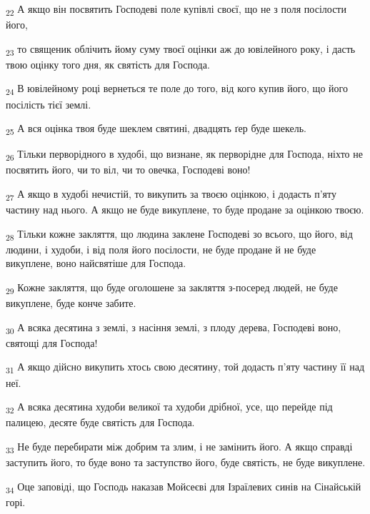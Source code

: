 \begin{tcolorbox}
\textsubscript{22} А якщо він посвятить Господеві поле купівлі своєї, що не з поля посілости його,
\end{tcolorbox}
\begin{tcolorbox}
\textsubscript{23} то священик облічить йому суму твоєї оцінки аж до ювілейного року, і дасть твою оцінку того дня, як святість для Господа.
\end{tcolorbox}
\begin{tcolorbox}
\textsubscript{24} В ювілейному році вернеться те поле до того, від кого купив його, що його посілість тієї землі.
\end{tcolorbox}
\begin{tcolorbox}
\textsubscript{25} А вся оцінка твоя буде шеклем святині, двадцять ґер буде шекель.
\end{tcolorbox}
\begin{tcolorbox}
\textsubscript{26} Тільки перворідного в худобі, що визнане, як перворідне для Господа, ніхто не посвятить його, чи то віл, чи то овечка, Господеві воно!
\end{tcolorbox}
\begin{tcolorbox}
\textsubscript{27} А якщо в худобі нечистій, то викупить за твоєю оцінкою, і додасть п'яту частину над нього. А якщо не буде викуплене, то буде продане за оцінкою твоєю.
\end{tcolorbox}
\begin{tcolorbox}
\textsubscript{28} Тільки кожне закляття, що людина заклене Господеві зо всього, що його, від людини, і худоби, і від поля його посілости, не буде продане й не буде викуплене, воно найсвятіше для Господа.
\end{tcolorbox}
\begin{tcolorbox}
\textsubscript{29} Кожне закляття, що буде оголошене за закляття з-посеред людей, не буде викуплене, буде конче забите.
\end{tcolorbox}
\begin{tcolorbox}
\textsubscript{30} А всяка десятина з землі, з насіння землі, з плоду дерева, Господеві воно, святощі для Господа!
\end{tcolorbox}
\begin{tcolorbox}
\textsubscript{31} А якщо дійсно викупить хтось свою десятину, той додасть п'яту частину її над неї.
\end{tcolorbox}
\begin{tcolorbox}
\textsubscript{32} А всяка десятина худоби великої та худоби дрібної, усе, що перейде під палицею, десяте буде святість для Господа.
\end{tcolorbox}
\begin{tcolorbox}
\textsubscript{33} Не буде перебирати між добрим та злим, і не замінить його. А якщо справді заступить його, то буде воно та заступство його, буде святість, не буде викуплене.
\end{tcolorbox}
\begin{tcolorbox}
\textsubscript{34} Оце заповіді, що Господь наказав Мойсеєві для Ізраїлевих синів на Сінайській горі.
\end{tcolorbox}
